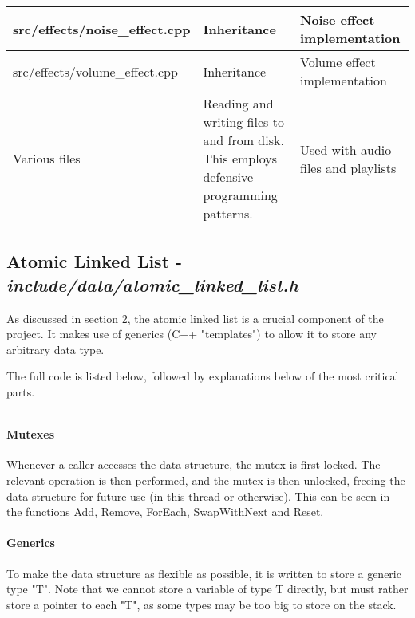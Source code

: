 {\begin{table}[h!]
\begin{center}
\begin{tabularx}{1.0 \textwidth} {
					| >{\raggedright\arraybackslash}X 
					| >{\raggedright\arraybackslash}X
					| >{\raggedright\arraybackslash}X 
					|
				}
				\hline
				src/effects/noise\_effect.cpp & Inheritance & Noise effect implementation \\
				
				\hline
				src/effects/volume\_effect.cpp & Inheritance & Volume effect implementation \\
				
				\hline
				Various files & Reading and writing files to and from disk. This employs defensive programming patterns. & Used with audio files and playlists \\
				
				\hline
			\end{tabularx}
		\end{center}
	\end{table}
}

\pagebreak
\subsection{Atomic Linked List - \textit{include/data/atomic\_linked\_list.h}}
As discussed in section 2, the atomic linked list is a crucial component of the project.  It makes use of generics (C++ "templates") to allow it to store any arbitrary data type. 

The full code is listed below, followed by explanations below of the most critical parts.

\inputminted[linenos]{c++}{../include/data/atomic_linked_list.h}

\paragraph{Mutexes} Whenever a caller accesses the data structure, the mutex is first locked. The relevant operation is then performed, and the mutex is then unlocked, freeing the data structure for future use (in this thread or otherwise). This can be seen in the functions Add, Remove, ForEach, SwapWithNext and Reset.

\paragraph{Generics} To make the data structure as flexible as possible, it is written to store a generic type "T". Note that we cannot store a variable of type T directly, but must rather store a pointer to each "T", as some types may be too big to store on the stack.

